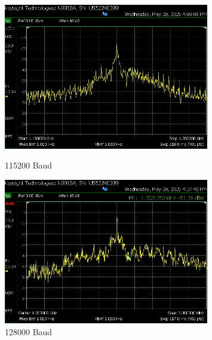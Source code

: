 \begin{figure}[H]
        \begin{minipage}{0.47\textwidth}
            \centering
            \includegraphics[width=0.8\textwidth]{Pictures/4.4C.115200.png}
            \caption*{115200 Baud}
        \end{minipage}
        \hfill
        \begin{minipage}{0.47\textwidth}
            \centering
            \includegraphics[width=0.8\textwidth]{Pictures/4.4C.128000.png}
            \caption*{128000 Baud}
        \end{minipage}


\end{figure}
